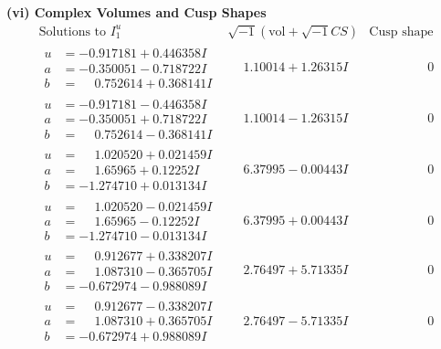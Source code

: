 \documentclass[1p]{elsarticle_modified}
\theoremstyle{definition}
\newcommand{\I}{\sqrt{-1}}
\begin{document}
\newpage\flushleft \textbf{(vi) Complex Volumes and Cusp Shapes}
$$\begin{array}{c|c|c}  
\text{Solutions to }I^u_{1}& \I (\text{vol} + \sqrt{-1}CS) & \text{Cusp shape}\\
 \hline 
\begin{aligned}
u &= -0.917181 + 0.446358 I \\
a &= -0.350051 - 0.718722 I \\
b &= \phantom{-}0.752614 + 0.368141 I\end{aligned}
 & \phantom{-}1.10014 + 1.26315 I & \phantom{-0.000000 } 0 \\ \hline\begin{aligned}
u &= -0.917181 - 0.446358 I \\
a &= -0.350051 + 0.718722 I \\
b &= \phantom{-}0.752614 - 0.368141 I\end{aligned}
 & \phantom{-}1.10014 - 1.26315 I & \phantom{-0.000000 } 0 \\ \hline\begin{aligned}
u &= \phantom{-}1.020520 + 0.021459 I \\
a &= \phantom{-}1.65965 + 0.12252 I \\
b &= -1.274710 + 0.013134 I\end{aligned}
 & \phantom{-}6.37995 - 0.00443 I & \phantom{-0.000000 } 0 \\ \hline\begin{aligned}
u &= \phantom{-}1.020520 - 0.021459 I \\
a &= \phantom{-}1.65965 - 0.12252 I \\
b &= -1.274710 - 0.013134 I\end{aligned}
 & \phantom{-}6.37995 + 0.00443 I & \phantom{-0.000000 } 0 \\ \hline\begin{aligned}
u &= \phantom{-}0.912677 + 0.338207 I \\
a &= \phantom{-}1.087310 - 0.365705 I \\
b &= -0.672974 - 0.988089 I\end{aligned}
 & \phantom{-}2.76497 + 5.71335 I & \phantom{-0.000000 } 0 \\ \hline\begin{aligned}
u &= \phantom{-}0.912677 - 0.338207 I \\
a &= \phantom{-}1.087310 + 0.365705 I \\
b &= -0.672974 + 0.988089 I\end{aligned}
 & \phantom{-}2.76497 - 5.71335 I & \phantom{-0.000000 } 0 \\ \hline\begin{aligned}

\end{aligned}
\end{array}$$
\end{document}
